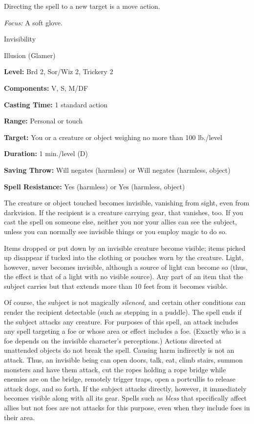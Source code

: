 \documentclass{article}
\begin{document}
Directing the spell to a new target is a move action.

\textit{Focus: }A soft glove.

\vspace{12pt}
Invisibility

Illusion (Glamer)

\textbf{Level:} Brd 2, Sor/Wiz 2, Trickery 2

\textbf{Components:} V, S, M/DF

\textbf{Casting Time:} 1 standard action

\textbf{Range:} Personal or touch

\textbf{Target:} You or a creature or object weighing no more than 100 lb./level

\textbf{Duration:} 1 min./level (D)

\textbf{Saving Throw: }Will negates (harmless) or Will negates (harmless, object)

\textbf{Spell Resistance:} Yes (harmless) or Yes (harmless, object)

The creature or object touched becomes invisible, vanishing from sight, even from 
darkvision. If the recipient is a creature carrying gear, that vanishes, too. If 
you cast the spell on someone else, neither you nor your allies can see the subject, 
unless you can normally see invisible things or you employ magic to do so.

Items dropped or put down by an invisible creature become visible; items picked 
up disappear if tucked into the clothing or pouches worn by the creature. Light, 
however, never becomes invisible, although a source of light can become so (thus, 
the effect is that of a light with no visible source). Any part of an item that 
the subject carries but that extends more than 10 feet from it becomes visible.

Of course, the subject is not magically \textit{silenced, }and certain other conditions 
can render the recipient detectable (such as stepping in a puddle). The spell ends 
if the subject attacks any creature. For purposes of this spell, an attack includes 
any spell targeting a foe or whose area or effect includes a foe. (Exactly who 
is a foe depends on the invisible character's perceptions.) Actions directed at 
unattended objects do not break the spell. Causing harm indirectly is not an attack. 
Thus, an invisible being can open doors, talk, eat, climb stairs, summon monsters 
and have them attack, cut the ropes holding a rope bridge while enemies are on 
the bridge, remotely trigger traps, open a portcullis to release attack dogs, and 
so forth. If the subject attacks directly, however, it immediately becomes visible 
along with all its gear. Spells such as \textit{bless }that specifically affect 
allies but not foes are not attacks for this purpose, even when they include foes 
in their area.
\end{document}
